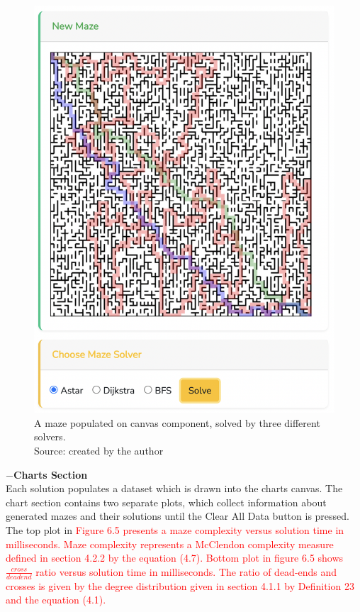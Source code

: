 \begin{figure}[!h]
    \centering
    \centering
    \includegraphics[scale =0.3 ]{mazeSolutions}
    \caption{A maze populated on canvas component, solved by three different solvers.\\Source: created by the author}
    \end{figure}
\newline    
\textbf{$-$Charts Section}\\
Each solution populates a dataset which is drawn into the charts canvas. The chart section contains two separate plots, which collect information about 
generated mazes and their solutions until the Clear All Data button is pressed. The top plot in \textcolor{red}{Figure 6.5 presents a maze complexity versus solution time in milliseconds.
Maze complexity represents a McClendon complexity measure defined in section 4.2.2 by the equation (4.7). Bottom plot in figure 6.5 shows $\frac{cross}{deadend}$
ratio versus solution time in milliseconds. The ratio of dead-ends and crosses is given by the degree distribution given in section 4.1.1 by Definition 23 and the equation (4.1).}\\
